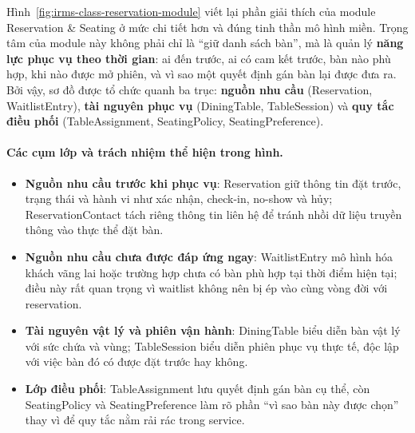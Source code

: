 \documentclass[11pt,a4paper]{article}
\begin{document}
Hình~\ref{fig:irms-class-reservation-module} viết lại phần giải thích của module Reservation \& Seating ở mức chi tiết hơn và đúng tinh thần mô hình miền. Trọng tâm của module này không phải chỉ là \enquote{giữ danh sách bàn}, mà là quản lý \textbf{năng lực phục vụ theo thời gian}: ai đến trước, ai có cam kết trước, bàn nào phù hợp, khi nào được mở phiên, và vì sao một quyết định gán bàn lại được đưa ra. Bởi vậy, sơ đồ được tổ chức quanh ba trục: \textbf{nguồn nhu cầu} (\textsf{Reservation}, \textsf{WaitlistEntry}), \textbf{tài nguyên phục vụ} (\textsf{DiningTable}, \textsf{TableSession}) và \textbf{quy tắc điều phối} (\textsf{TableAssignment}, \textsf{SeatingPolicy}, \textsf{SeatingPreference}).

\paragraph{Các cụm lớp và trách nhiệm thể hiện trong hình.}
\begin{itemize}
  \item \textbf{Nguồn nhu cầu trước khi phục vụ}: \textsf{Reservation} giữ thông tin đặt trước, trạng thái và hành vi như xác nhận, check-in, no-show và hủy; \textsf{ReservationContact} tách riêng thông tin liên hệ để tránh nhồi dữ liệu truyền thông vào thực thể đặt bàn.
  \item \textbf{Nguồn nhu cầu chưa được đáp ứng ngay}: \textsf{WaitlistEntry} mô hình hóa khách vãng lai hoặc trường hợp chưa có bàn phù hợp tại thời điểm hiện tại; điều này rất quan trọng vì waitlist không nên bị ép vào cùng vòng đời với reservation.
  \item \textbf{Tài nguyên vật lý và phiên vận hành}: \textsf{DiningTable} biểu diễn bàn vật lý với sức chứa và vùng; \textsf{TableSession} biểu diễn phiên phục vụ thực tế, độc lập với việc bàn đó có được đặt trước hay không.
  \item \textbf{Lớp điều phối}: \textsf{TableAssignment} lưu quyết định gán bàn cụ thể, còn \textsf{SeatingPolicy} và \textsf{SeatingPreference} làm rõ phần \enquote{vì sao bàn này được chọn} thay vì để quy tắc nằm rải rác trong service.
\end{itemize}
\end{document}
